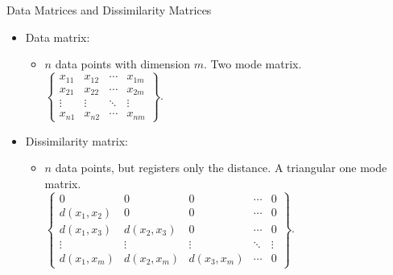 \begin{frame}{Data Matrices and Dissimilarity Matrices}
	\centering
	\begin{itemize}
		\item Data matrix:
		      \begin{itemize}
			      \item $n$ data points with dimension $m$. Two mode matrix.\\
			            {$\begin{Bmatrix}
					            x_{11} & x_{12} & \cdots & x_{1m} \\
					            x_{21} & x_{22} & \cdots & x_{2m} \\
					            \vdots & \vdots & \ddots & \vdots \\
					            x_{n1} & x_{n2} & \cdots & x_{nm}
				            \end{Bmatrix}$.}
		      \end{itemize}
		\item Dissimilarity matrix:
		      \begin{itemize}
			      \item $n$ data points, but registers only the distance. A triangular one mode matrix.\\
			            {$\begin{Bmatrix}
					            0              & 0              & 0              & \cdots & 0      \\
					            d(x_{1},x_{2}) & 0              & 0              & \cdots & 0      \\
					            d(x_{1},x_{3}) & d(x_{2},x_{3}) & 0              & \cdots & 0      \\
					            \vdots         & \vdots         & \vdots         & \ddots & \vdots \\
					            d(x_{1},x_{m}) & d(x_{2},x_{m}) & d(x_{3},x_{m}) & \cdots & 0
				            \end{Bmatrix}$.}
		      \end{itemize}
	\end{itemize}
\end{frame}

